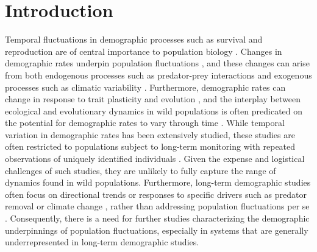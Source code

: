 \documentclass[11pt]{article}
\begin{document}

\newpage{}

\section*{Introduction} \label{introduction}

Temporal fluctuations in demographic processes such as survival and reproduction
are of central importance to population biology
\citep{twombly1994,fox2000population,koons2016life}.
Changes in demographic rates underpin population fluctuations \citep{coulson2005decomposing},
and these changes can arise from both 
endogenous processes such as predator-prey interactions 
\citep{rosenzweig1963}
and exogenous processes such as climatic variability
\citep{elton1924}.
Furthermore, demographic rates can change in response to trait plasticity and evolution
\citep{ellner2011does, bonnet2019role},
and the interplay between ecological and evolutionary dynamics in wild populations 
is often predicated on the potential for demographic rates to vary through time
\citep{coulson2006putting, siepielski2009s, ozgul2010coupled, ellner2011does}.
While temporal variation in demographic rates has been extensively studied,
these studies are often restricted to populations subject to long-term monitoring
with repeated observations of uniquely identified individuals 
\citep[e.g., mark-recapture;][]{fujiwara2002}.
Given the expense and logistical challenges of such studies, 
they are unlikely to fully capture the range of dynamics found in wild populations.
Furthermore, long-term demographic studies often focus on directional trends
or responses to specific drivers such as predator removal 
\citep[e.g., ][]{ diller2016demographic}
or climate change \citep{hunter2010climate},
rather than addressing 
population fluctuations per se \citep[but see][]
{white2007irruptive, koons2017understanding, taylor2018demographic, hoy2020fluctuations}.
Consequently, 
there is a need for further studies characterizing the demographic underpinnings 
of population fluctuations, 
especially in systems that are generally underrepresented 
in long-term demographic studies.
\end{document}
